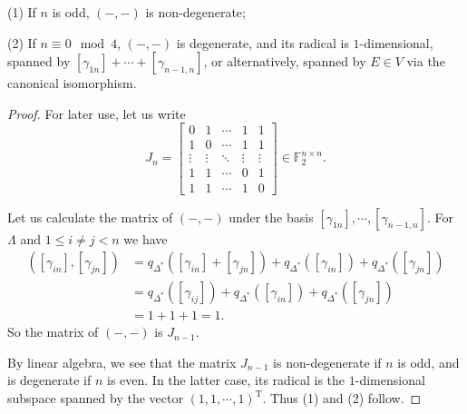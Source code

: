\documentclass[10pt,a4paper]{amsart}
\begin{document}
\begin{lemma}
    \par(1) If $n$ is odd, $(-,-)$ is non-degenerate;
    \par(2) If $n\equiv0\mod4$, $(-,-)$ is degenerate, and its radical is $1$-dimensional, spanned by $[\gamma_{1n}]+\cdots+[\gamma_{n-1,n}]$, or alternatively, spanned by $E\in V$ via the canonical isomorphism.
\end{lemma}

\begin{proof}
    \par For later use, let us write
    \[J_n=\begin{bmatrix}
        0&1&\cdots&1&1\\
        1&0&\cdots&1&1\\
        \vdots&\vdots&\ddots&\vdots&\vdots\\
        1&1&\cdots&0&1\\
        1&1&\cdots&1&0
    \end{bmatrix}\in\mathbb{F}_2^{n\times n}.\]
    \par Let us calculate the matrix of $(-,-)$ under the basis $[\gamma_{1n}],\cdots,[\gamma_{n-1,n}]$. For $\Lambda$ and $1\leq i\ne j<n$ we have
    \[\begin{aligned}
        ([\gamma_{in}],[\gamma_{jn}])
        &=q_{\Delta^*}([\gamma_{in}]+[\gamma_{jn}])+q_{\Delta^*}([\gamma_{in}])+q_{\Delta^*}([\gamma_{jn}])\\
        &=q_{\Delta^*}([\gamma_{ij}])+q_{\Delta^*}([\gamma_{in}])+q_{\Delta^*}([\gamma_{jn}])\\
        &=1+1+1
        =1.
    \end{aligned}\]
    So the matrix of $(-,-)$ is $J_{n-1}$.
    \par By linear algebra, we see that the matrix $J_{n-1}$ is non-degenerate if $n$ is odd, and is degenerate if $n$ is even. In the latter case, its radical is the $1$-dimensional subspace spanned by the vector $(1,1,\cdots,1)^{\mathrm{T}}$. Thus (1) and (2) follow.
\end{proof}
\end{document}
